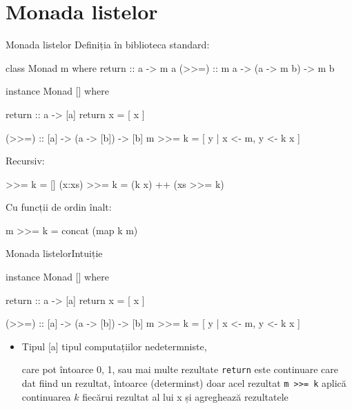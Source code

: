\documentclass[xcolor=pdftex,romanian,colorlinks]{beamer}
\begin{document}
%
\section{Monada listelor}

\begin{frame}[fragile]{Monada listelor}
Definiția în biblioteca standard:
\begin{asciihs}
     class Monad m where
       return :: a -> m a
       (>>=) :: m a -> (a -> m b) -> m b

     instance Monad [] where

       return       :: a -> [a]
       return x     = [ x ]

       (>>=)        :: [a] -> (a -> [b]) -> [b]
       m >>= k      = [ y | x <- m, y <- k x ]
\end{asciihs}
Recursiv:
\vspace{-1ex}
\begin{asciihs}
       [] >>= k            =   []
       (x:xs) >>= k        =   (k x) ++ (xs >>= k)
\end{asciihs}
Cu funcții de ordin înalt:
\vspace{-1ex}
\begin{asciihs}
       m >>= k    =   concat (map k m)
\end{asciihs}
\end{frame}

\begin{frame}[fragile]{Monada listelor}{Intuiție}
\begin{asciihs}
     instance Monad [] where

       return       :: a -> [a]
       return x     = [ x ]

       (>>=)        :: [a] -> (a -> [b]) -> [b]
       m >>= k      = [ y | x <- m, y <- k x ]
\end{asciihs}
\begin{itemize}
\item Tipul [a] tipul computațiilor nedetermniste, 

care pot întoarce 0, 1, sau mai multe rezultate
\vitem \lstinline$return$ este continuare care dat fiind un rezultat, întoarce
(determinst) doar acel rezultat
\vitem \lstinline$m >>= k$ aplică continuarea $k$ fiecărui rezultat al lui x
și agreghează rezultatele
\end{itemize}
\end{frame}
\end{document}
